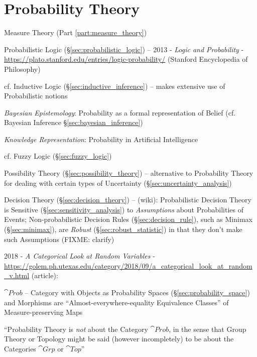 \part{Probability Theory}\label{part:probability_theory}

\fist Measure Theory (Part \ref{part:measure_theory})

\fist Probabilistic Logic (\S\ref{sec:probabilistic_logic}) --
2013 - \emph{Logic and Probability} -
\url{https://plato.stanford.edu/entries/logic-probability/} (Stanford
Encyclopedia of Philosophy)

\fist cf. Inductive Logic (\S\ref{sec:inductive_inference}) -- makes extensive
use of Probabilistic notions

\emph{Bayesian Epistemology}: Probability as a formal representation of Belief
(cf. Bayesian Inference \S\ref{sec:bayesian_inference})

\emph{Knowledge Representation}: Probability in Artificial Intelligence

\fist cf. Fuzzy Logic (\S\ref{sec:fuzzy_logic})

\fist Possibility Theory (\S\ref{sec:possibility_theory}) -- alternative to
Probability Theory for dealing with certain types of Uncertainty
(\S\ref{sec:uncertainty_analysis})

\fist Decision Theory (\S\ref{sec:decision_theory}) --
(wiki): Probabilistic Decision Theory is Sensitive
(\S\ref{sec:sensitivity_analysis}) to \emph{Assumptions} about Probabilities of
Events; Non-probabilistic Decision Rules (\S\ref{sec:decision_rule}), such as
Minimax (\S\ref{sec:minimax}), are \emph{Robust} (\S\ref{sec:robust_statistic})
in that they don't make such Assumptions (FIXME: clarify)

2018 - \emph{A Categorical Look at Random Variables} -
\url{https://golem.ph.utexas.edu/category/2018/09/a_categorical_look_at_random_v.html}
(article):

$\cat{Prob}$ -- Category with Objects as Probability Spaces
(\S\ref{sec:probability_space}) and Morphisms are ``Almost-everywhere-equality
Equivalence Classes'' of Measure-preserving Maps

``Probability Theory is \emph{not} about the Category $\cat{Prob}$, in the sense
that Group Theory or Topology might be said (however incompletely) to be about
the Categories $\cat{Grp}$ or $\cat{Top}$''

